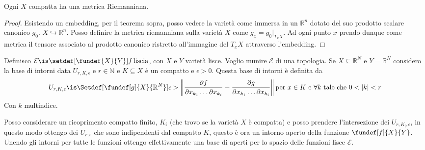 \begin{teo}
Ogni $X$ compatta ha una metrica Riemanniana.
\end{teo}

\begin{proof}
  Esistendo un embedding, per il teorema sopra, posso vedere la varietà come immersa in un $\mathbb{R}^{n}$ dotato del suo prodotto scalare canonico $g_{0}$. $X \hookrightarrow \mathbb{R}^{n}$.
  Posso definire la metrica riemanniana sulla varietà $X$ come $g_{x} = g_{0}|_{T_x X}$.
 Ad ogni punto $x$ prendo dunque come metrica il tensore associato al prodotto canonico ristretto all'immagine del $T_x X$ attraverso l'embedding.
\end{proof}




\begin{defn}
Definisco $\mathcal{E} \is \setdef[\fundef{X}{Y}]{f \, \text{liscia}}$, con $X$ e $Y$ varietà lisce. Voglio munire $\mathcal{E}$ di una topologia.
Se $X \subseteq \mathbb{R}^{N}$ e $Y = \mathbb{R}^{N}$ considero la base di intorni data $U_{r, K, \epsilon}$ e $r \in \mathbb{N}$ e $K \subseteq X$  è un compatto e $\epsilon > 0$. Questa base di intorni è definita da 
\[U_{r, K, \epsilon} \is \Setdef[{\fundef[g]{X}{\mathbb{R}^{N}}}]{\epsilon > \left\|\frac{\partial f}{\partial x_{k_{1}} \dots \partial x_{k_{i}}} - \frac{\partial g}{\partial x_{k_{1}} \dots \partial x_{k_{i}}}\right\| \text{per } x \in K \text{ e } \forall k \text{ tale che } 0<|k|<r}\]
Con $k$ multindice.

Posso considerare un ricoprimento compatto finito,  ${K_i}$ (che trovo se la varietà $X$ è compatta) e posso prendere l'intersezione dei $U_{r,K_i, \epsilon}$, in questo modo ottengo
dei $U_{r, \epsilon}$ che sono indipendenti dal compatto $K$, questo è ora un intorno aperto della funzione $\fundef[f]{X}{Y}$. 
Unendo gli intorni per tutte le funzioni ottengo effettivamente una base di aperti per lo spazio delle funzioni lisce $\mathcal{E}$.
\end{defn}


